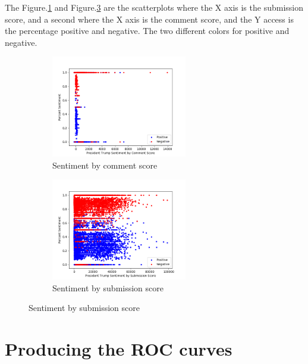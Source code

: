 \documentclass[12pt]{article}
\begin{document}
The Figure.\ref{fig:5} and Figure.\ref{fig:6} are the scatterplots where the X axis is the submission score, and a second where the X axis is the comment score, and the Y access is the percentage positive and negative. The two different colors for positive and negative.
\begin{figure}[!h]
      \centering
    \begin{subfigure}
        \centering
        \includegraphics[width=0.65\textwidth]{../plots/part5_com.png}
        \caption{Sentiment by comment score}
        \label{fig:5}
    \end{subfigure}%
    \vspace{1em}
    \begin{subfigure}
       \centering
        \includegraphics[width=0.65\textwidth]{../plots/part5_sub.png}
        \caption{Sentiment by submission score}
        \label{fig:6}
    \end{subfigure}
\end{figure}


\section{Producing the ROC curves}
\end{document}
